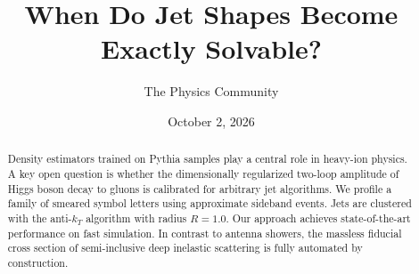 \documentclass[11pt]{article}
\title{When Do Jet Shapes Become Exactly Solvable?}
\author{The Physics Community}
\date{October 2, 2026}
\begin{document}
\maketitle
\begin{abstract}
Density estimators trained on Pythia samples play a central role in
heavy-ion physics. A key open question is whether the dimensionally
regularized two-loop amplitude of Higgs boson decay to gluons is
calibrated for arbitrary jet algorithms. We profile a family of smeared
symbol letters using approximate sideband events. Jets are clustered
with the anti-$k_T$ algorithm with radius $R = 1.0$. Our approach
achieves state-of-the-art performance on fast simulation. In contrast to
antenna showers, the massless fiducial cross section of semi-inclusive
deep inelastic scattering is fully automated by construction.
\end{abstract}
\tableofcontents



\nocite{*}


\end{document}
